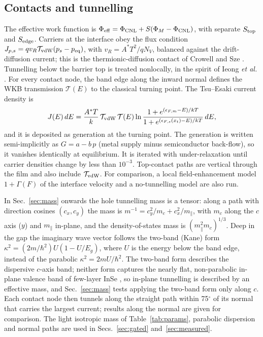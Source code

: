 \documentclass[11pt]{article}
\begin{document}
\subsection{Contacts and tunnelling}
The effective work function is $\Phi_{\rm eff}=\Phi_{\rm CNL}+S(\Phi_M-\Phi_{\rm CNL})$, with separate $S_{\rm top}$ and $S_{\rm edge}$. Carriers at the interface obey the flux condition $J_{p,s}=qv_R\mathcal{T}_{\rm vdW}(p_s-p_{\rm eq})$, with $v_R=A^*T^2/qN_V$, balanced against the drift-diffusion current; this is the thermionic-diffusion contact of Crowell and Sze \cite{refcrowell}. Tunnelling below the barrier top is treated nonlocally, in the spirit of Ieong \textit{et al.} \cite{refieong}. For every contact node, the band edge along the inward normal defines the WKB transmission $\mathcal{T}(E)$ to the classical turning point. The Tsu--Esaki current density is
\begin{equation}
J(E)\,dE=\frac{A^*T}{k}\,\mathcal{T}_{\rm vdW}\,\mathcal{T}(E)\ln\frac{1+e^{(\epsilon_{F,m}-E)/kT}}{1+e^{(\epsilon_{F,s}(x_t)-E)/kT}}\,dE,
\end{equation}
and it is deposited as generation at the turning point. The generation is written semi-implicitly as $G=a-b\,p$ (metal supply minus semiconductor back-flow), so it vanishes identically at equilibrium. It is iterated with under-relaxation until carrier densities change by less than $10^{-3}$. Top-contact paths are vertical through the film and also include $\mathcal{T}_{\rm vdW}$. For comparison, a local field-enhancement model $1+\Gamma(F)$ of the interface velocity \cite{refpad} and a no-tunnelling model are also run.

In Sec.~\ref{sec:mass} onwards the hole tunnelling mass is a tensor: along a path with direction cosines $(c_x,c_y)$ the mass is $m^{-1}=c_y^2/m_c+c_x^2/m_\parallel$, with $m_c$ along the $c$ axis ($y$) and $m_\parallel$ in-plane, and the density-of-states mass is $(m_\parallel^2m_c)^{1/3}$. Deep in the gap the imaginary wave vector follows the two-band (Kane) form $\kappa^2=(2m/\hbar^2)U(1-U/E_g)$, where $U$ is the energy below the band edge, instead of the parabolic $\kappa^2=2mU/\hbar^2$. The two-band form describes the dispersive $c$-axis band; neither form captures the nearly flat, non-parabolic in-plane valence band of few-layer InSe \cite{refceferino}, so in-plane tunnelling is described by an effective mass, and Sec.~\ref{sec:mass} tests applying the two-band form only along $c$. Each contact node then tunnels along the straight path within 75$^\circ$ of its normal that carries the largest current; results along the normal are given for comparison. The light isotropic mass of Table~\ref{tab:params}, parabolic dispersion and normal paths are used in Secs.~\ref{sec:gated} and~\ref{sec:measured}.
\end{document}
